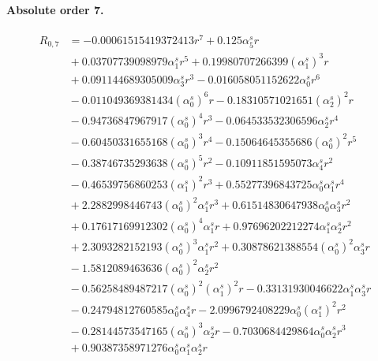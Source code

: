 \documentclass[10pt]{article}
\begin{document}
\paragraph{Absolute order 7.}
\begin{align*}
R_{0,7} &=  - 0.00061515419372413 r^{7} + 0.125 \alpha_{5}^s r \\
&{}  + 0.03707739098979 \alpha_{1}^s r^{5} + 0.19980707266399 \left(\alpha_{1}^s\right)^{3} r \\
&{}  + 0.091144689305009 \alpha_{3}^s r^{3} - 0.016058051152622 \alpha_{0}^s r^{6} \\
&{}  - 0.011049369381434 \left(\alpha_{0}^s\right)^{6} r - 0.18310571021651 \left(\alpha_{2}^s\right)^{2} r \\
&{}  - 0.94736847967917 \left(\alpha_{0}^s\right)^{4} r^{3} - 0.064533532306596 \alpha_{2}^s r^{4} \\
&{}  - 0.60450331655168 \left(\alpha_{0}^s\right)^{3} r^{4} - 0.15064645355686 \left(\alpha_{0}^s\right)^{2} r^{5} \\
&{}  - 0.38746735293638 \left(\alpha_{0}^s\right)^{5} r^{2} - 0.10911851595073 \alpha_{4}^s r^{2} \\
&{}  - 0.46539756860253 \left(\alpha_{1}^s\right)^{2} r^{3} + 0.55277396843725 \alpha_{0}^s \alpha_{1}^s r^{4} \\
&{}  + 2.2882998446743 \left(\alpha_{0}^s\right)^{2} \alpha_{1}^s r^{3} + 0.61514830647938 \alpha_{0}^s \alpha_{3}^s r^{2} \\
&{}  + 0.17617169912302 \left(\alpha_{0}^s\right)^{4} \alpha_{1}^s r + 0.97696202212274 \alpha_{1}^s \alpha_{2}^s r^{2} \\
&{}  + 2.3093282152193 \left(\alpha_{0}^s\right)^{3} \alpha_{1}^s r^{2} + 0.30878621388554 \left(\alpha_{0}^s\right)^{2} \alpha_{3}^s r \\
&{}  - 1.5812089463636 \left(\alpha_{0}^s\right)^{2} \alpha_{2}^s r^{2} \\
&{}  - 0.56258489487217 \left(\alpha_{0}^s\right)^{2} \left(\alpha_{1}^s\right)^{2} r - 0.33131930046622 \alpha_{1}^s \alpha_{3}^s r \\
&{}  - 0.24794812760585 \alpha_{0}^s \alpha_{4}^s r - 2.0996792408229 \alpha_{0}^s \left(\alpha_{1}^s\right)^{2} r^{2} \\
&{}  - 0.28144573547165 \left(\alpha_{0}^s\right)^{3} \alpha_{2}^s r - 0.7030684429864 \alpha_{0}^s \alpha_{2}^s r^{3} \\
&{}  + 0.90387358971276 \alpha_{0}^s \alpha_{1}^s \alpha_{2}^s r
\end{align*}
\end{document}
